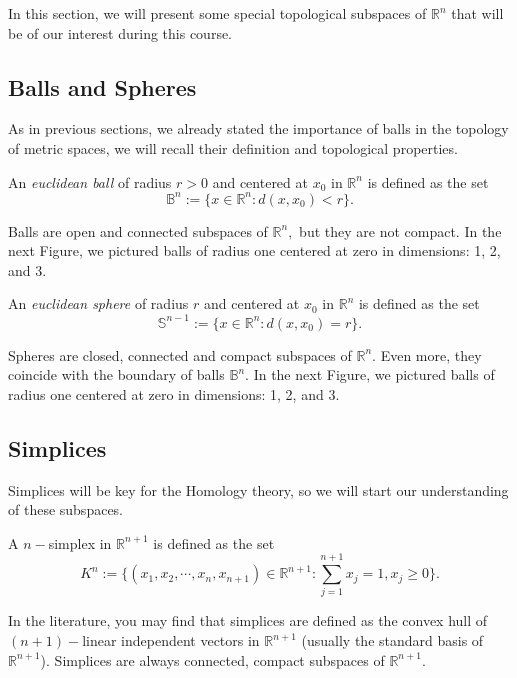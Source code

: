 \documentclass[
	fontsize=10pt, %
	twoside=false, %
	secnumdepth=1, %
]{kaobook}
\begin{document}
In this section, we will present some special topological subspaces of $\mathbb{R}^n$ that will be of our interest during this course. 

\subsection{Balls and Spheres}

As in previous sections, we already stated the importance of balls in the topology of metric spaces, we will recall their definition and topological properties.

\begin{definition}
An \emph{euclidean ball} of radius $r>0$ and centered at $x_0$ in $\mathbb{R}^n$ is defined as the set $$\mathbb{B}^n:=\{x\in\mathbb{R}^n: d(x,x_0)<r\}.$$
\end{definition}

Balls are open and connected subspaces of $\mathbb{R}^n,$  but they are not compact. In the next Figure, we pictured balls of radius one centered at zero in dimensions: 1, 2, and 3.

\begin{definition}
An \emph{euclidean sphere} of radius $r$ and centered at $x_0$ in $\mathbb{R}^n$ is defined as the set $$\mathbb{S}^{n-1}:=\{x\in\mathbb{R}^n: d(x,x_0)=r\}.$$
\end{definition}

Spheres are closed, connected and compact subspaces of $\mathbb{R}^n.$ Even more, they coincide with the boundary of balls $\mathbb{B}^n.$ In the next Figure, we pictured balls of radius one centered at zero in dimensions: 1, 2, and 3.

\subsection{Simplices}

Simplices will be key for the Homology theory, so we will start our understanding of these subspaces.

\begin{definition}
A $n-$simplex in $\mathbb{R}^{n+1}$ is defined as the set $$K^n:=\{(x_1,x_2,\cdots, x_n,x_{n+1})\in \mathbb{R}^{n+1}: \sum_{j=1}^{n+1} x_j =1, x_j\geq 0\}.$$
\end{definition}

In the literature, you may find that simplices are defined as the convex hull of $(n+1)-$linear independent vectors in $\mathbb{R}^{n+1}$ (usually the standard basis of $\mathbb{R}^{n+1}$). Simplices are always connected, compact subspaces of $\mathbb{R}^{n+1}.$ 
\end{document}
